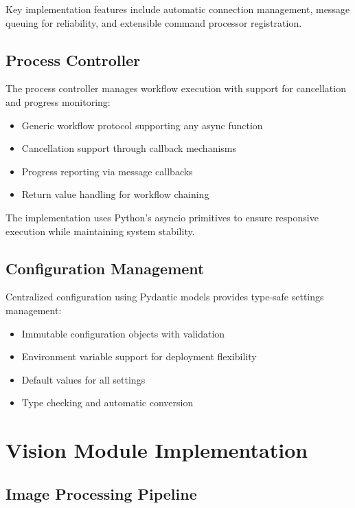Key implementation features include automatic connection management, message queuing for reliability, and extensible command processor registration.

\subsection{Process Controller}

The process controller manages workflow execution with support for cancellation and progress monitoring:

\begin{itemize}
    \item Generic workflow protocol supporting any async function
    \item Cancellation support through callback mechanisms
    \item Progress reporting via message callbacks
    \item Return value handling for workflow chaining
\end{itemize}

The implementation uses Python's asyncio primitives to ensure responsive execution while maintaining system stability.

\subsection{Configuration Management}

Centralized configuration using Pydantic models provides type-safe settings management:

\begin{itemize}
    \item Immutable configuration objects with validation
    \item Environment variable support for deployment flexibility
    \item Default values for all settings
    \item Type checking and automatic conversion
\end{itemize}

\section{Vision Module Implementation}

\subsection{Image Processing Pipeline}


